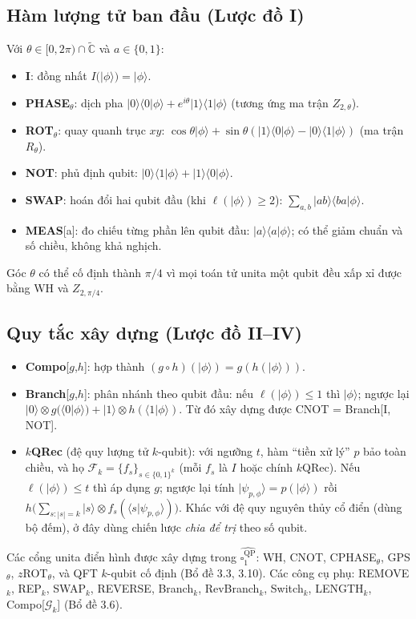 \documentclass[10pt]{article}
\begin{document}
\subsection*{Hàm lượng tử ban đầu (Lược đồ I)}
Với $\theta\in[0,2\pi)\cap\tilde{\mathbb{C}}$ và $a\in\{0,1\}$:
\begin{itemize}[noitemsep]
  \item \textbf{I}: đồng nhất $I(|\phi\rangle)=|\phi\rangle$.
  \item \textbf{PHASE}$_\theta$: dịch pha $|0\rangle\langle 0|\phi\rangle+e^{i\theta}|1\rangle\langle 1|\phi\rangle$ (tương ứng ma trận $Z_{2,\theta}$).
  \item \textbf{ROT}$_\theta$: quay quanh trục $xy$: $\cos\theta|\phi\rangle+\sin\theta(|1\rangle\langle 0|\phi\rangle-|0\rangle\langle 1|\phi\rangle)$ (ma trận $R_\theta$).
  \item \textbf{NOT}: phủ định qubit: $|0\rangle\langle 1|\phi\rangle+|1\rangle\langle 0|\phi\rangle$.
  \item \textbf{SWAP}: hoán đổi hai qubit đầu (khi $\ell(|\phi\rangle)\ge 2$): $\sum_{a,b}|ab\rangle\langle ba|\phi\rangle$.
  \item \textbf{MEAS}[a]: đo chiếu từng phần lên qubit đầu: $|a\rangle\langle a|\phi\rangle$; có thể giảm chuẩn và số chiều, không khả nghịch.
\end{itemize}
Góc $\theta$ có thể cố định thành $\pi/4$ vì mọi toán tử unita một qubit đều xấp xỉ được bằng WH và $Z_{2,\pi/4}$.

\subsection*{Quy tắc xây dựng (Lược đồ II--IV)}
\begin{itemize}[noitemsep]
  \item \textbf{Compo}[$g$,$h$]: hợp thành $(g\circ h)(|\phi\rangle)=g(h(|\phi\rangle))$.
  \item \textbf{Branch}[$g$,$h$]: phân nhánh theo qubit đầu: nếu $\ell(|\phi\rangle)\le 1$ thì $|\phi\rangle$; ngược lại $|0\rangle\otimes g(\langle 0|\phi\rangle)+|1\rangle\otimes h(\langle 1|\phi\rangle)$. Từ đó xây dựng được CNOT = Branch[I, NOT].
  \item \textbf{$k$QRec} (đệ quy lượng tử $k$-qubit): với ngưỡng $t$, hàm ``tiền xử lý'' $p$ bảo toàn chiều, và họ $\mathcal{F}_k=\{f_s\}_{s\in\{0,1\}^k}$ (mỗi $f_s$ là $I$ hoặc chính $k$QRec). Nếu $\ell(|\phi\rangle)\le t$ thì áp dụng $g$; ngược lại tính $|\psi_{p,\phi}\rangle=p(|\phi\rangle)$ rồi $h\bigl(\sum_{s:|s|=k}|s\rangle\otimes f_s(\langle s|\psi_{p,\phi}\rangle)\bigr)$. Khác với đệ quy nguyên thủy cổ điển (dùng bộ đếm), ở đây dùng chiến lược \emph{chia để trị} theo số qubit.
\end{itemize}
Các cổng unita điển hình được xây dựng trong $\widehat{\square_1^{\mathrm{QP}}}$: WH, CNOT, CPHASE$_\theta$, GPS$_\theta$, $z$ROT$_\theta$, và QFT $k$-qubit cố định (Bổ đề 3.3, 3.10). Các công cụ phụ: REMOVE$_k$, REP$_k$, SWAP$_k$, REVERSE, Branch$_k$, RevBranch$_k$, Switch$_k$, LENGTH$_k$, Compo[$\mathcal{G}_k$] (Bổ đề 3.6).
\end{document}
